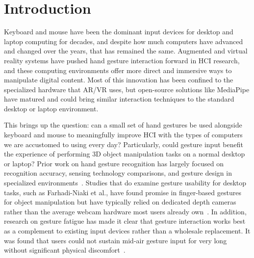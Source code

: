 \documentclass[manuscript]{acmart}
\begin{document}


\maketitle

\section{Introduction}

Keyboard and mouse have been the dominant input devices for desktop and laptop computing for decades, and despite how much computers have advanced and changed over the years, that has remained the same. Augmented and virtual reality systems have pushed hand gesture interaction forward in HCI research, and these computing environments offer more direct and immersive ways to manipulate digital content. Most of this innovation has been confined to the specialized hardware that AR/VR uses, but open-source solutions like MediaPipe have matured and could bring similar interaction techniques to the standard desktop or laptop environment.

This brings up the question: can a small set of hand gestures be used alongside keyboard and mouse to meaningfully improve HCI with the types of computers we are accustomed to using every day? Particularly, could gesture input benefit the experience of performing 3D object manipulation tasks on a normal desktop or laptop? Prior work on hand gesture recognition has largely focused on recognition accuracy, sensing technology comparisons, and gesture design in specialized environments~\cite{guo2021, rautaray2015}. Studies that do examine gesture usability for desktop tasks, such as Farhadi-Niaki et al., have found promise in finger-based gestures for object manipulation but have typically relied on dedicated depth cameras rather than the average webcam hardware most users already own~\cite{farhadi2013}. In addition, research on gesture fatigue has made it clear that gesture interaction works best as a complement to existing input devices rather than a wholesale replacement. It was found that users could not sustain mid-air gesture input for very long without significant physical discomfort~\cite{hansberger2017}.
\end{document}
